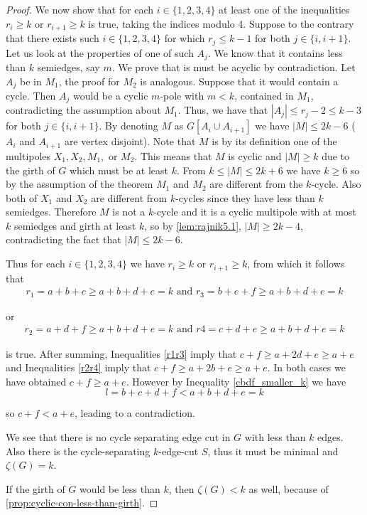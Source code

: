 \documentclass[12pt, twoside]{book}
\begin{document}
\begin{proof}
	We now show that for each $i\in\{1,2,3,4\}$ at least one of the inequalities $r_i\geq k$ or $r_{i+1}\geq k$ is true, taking the indices modulo 4. Suppose to the contrary that there exists such $i\in\{1,2,3,4\}$ for which $r_j\leq k-1$ for both $j\in\{i, i+1\}$. Let us look at the properties of one of such $A_j$. We know that it contains less than $k$ semiedges, say $m$. We prove that is must be acyclic by contradiction. Let $A_j$ be in $M_1$, the proof for $M_2$ is analogous. Suppose that it would contain a cycle. Then $A_j$ would be a cyclic $m$-pole with $m<k$, contained in $M_1$, contradicting the assumption about $M_1$. Thus, we have that $|A_j|\leq r_j-2\leq k-3$ for both $j\in \{i, i+1\}$. By denoting $M$ as $G[A_i\cup A_{i+1}]$ we have $|M|\leq 2k-6$ ($A_i$ and $A_{i+1}$ are vertex disjoint). Note that $M$ is by its definition one of the multipoles $X_1, X_2, M_1,$ or $M_2$. This means that $M$ is cyclic and $|M|\geq k$ due to the girth of $G$ which must be at least $k$. From $k\leq |M|\leq 2k+6$ we have $k\geq 6$ so by the assumption of the theorem $M_1$ and $M_2$ are different from the $k$-cycle. Also both of $X_1$ and $X_2$ are different from $k$-cycles since they have less than $k$ semiedges. Therefore $M$ is not a $k$-cycle and it is a cyclic multipole with at most $k$ semiedges and girth at least $k$, so by \cref{lem:rajnik5.1}, $|M| \geq 2k - 4$, contradicting the fact that $|M|\leq 2k-6$.
	
	Thus for each $i\in\{1,2,3,4\}$ we have $r_i\geq k$ or $r_{i+1}\geq k$, from which it follows that
	\begin{align}
		r_1 =a+b+c\geq a+b+d+e=k \text{ and } r_3 =b+e+f \geq a+b+d+e=k\label{r1r3}
	\end{align}
	
	or
	\begin{align}
		r_2 =a+d+f \geq a+b+d+e=k \text{ and } r4 =c+d+e\geq a+b+d+e=k\label{r2r4}
	\end{align}
	
	is true. After summing, Inequalities \cref{r1r3} imply that $c+f\geq a+2d+e\geq a+e$ and Inequalities \cref{r2r4} imply that $c+f\geq a+2b+e\geq a+e$. In both cases we have obtained $c+f\geq a+e$. However by Inequality \cref{cbdf_smaller_k} we have 
	$$l=b+c+d+f<a+b+d+e=k$$
	
	so $c+f<a+e$, leading to a contradiction.
	
	We see that there is no cycle separating edge cut in $G$ with less than $k$ edges. Also there is the cycle-separating $k$-edge-cut $S$, thus it must be minimal and $\zeta(G)=k$.
	
	If the girth of $G$ would be less than $k$, then $\zeta(G)<k$ as well, because of \cref{prop:cyclic-con-less-than-girth}.
\end{proof}
\end{document}
